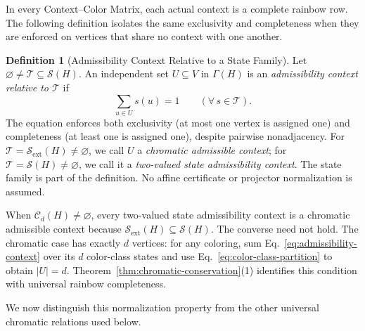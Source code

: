 \documentclass[aps,pra,reprint,superscriptaddress,longbibliography,nofootinbib,floatfix,10pt]{revtex4-2}
\theoremstyle{definition}\newtheorem{definition}[theorem]{Definition}
\theoremstyle{remark}\newtheorem{remark}[theorem]{Remark}
\newcommand{\Sc}{\mathcal S}\newcommand{\Cc}{\mathcal C}\newcommand{\Wc}{\mathcal W}
\begin{document}
In every Context--Color Matrix, each actual context is a complete rainbow row. The following definition isolates the same exclusivity and completeness when they are enforced on vertices that share no context with one another.

\begin{definition}[Admissibility Context Relative to a State Family]\label{def:admissibility-context}
Let $\varnothing\neq\mathcal T\subseteq\Sc(H)$. An independent set $U\subseteq V$ in $\Gamma(H)$ is an \emph{admissibility context relative to $\mathcal T$} if
\begin{equation}\label{eq:admissibility-context}
\sum_{u\in U}s(u)=1\qquad(\forall\,s\in\mathcal T).
\end{equation}
The equation enforces both exclusivity (at most one vertex is assigned one) and completeness (at least one is assigned one), despite pairwise nonadjacency. For $\mathcal T=\Sc_{\mathrm{ext}}(H)\neq\varnothing$, we call $U$ a \emph{chromatic admissible context}; for $\mathcal T=\Sc(H)\neq\varnothing$, we call it a \emph{two-valued state admissibility context}. The state family is part of the definition. No affine certificate or projector normalization is assumed.
\end{definition}

When $\Cc_d(H)\neq\varnothing$, every two-valued state admissibility context is a chromatic admissible context because $\Sc_{\mathrm{ext}}(H)\subseteq\Sc(H)$. The converse need not hold. The chromatic case has exactly $d$ vertices: for any coloring, sum Eq.~\eqref{eq:admissibility-context} over its $d$ color-class states and use Eq.~\eqref{eq:color-class-partition} to obtain $|U|=d$. Theorem~\ref{thm:chromatic-conservation}(1) identifies this condition with universal rainbow completeness.

We now distinguish this normalization property from the other universal chromatic relations used below.
\end{document}
